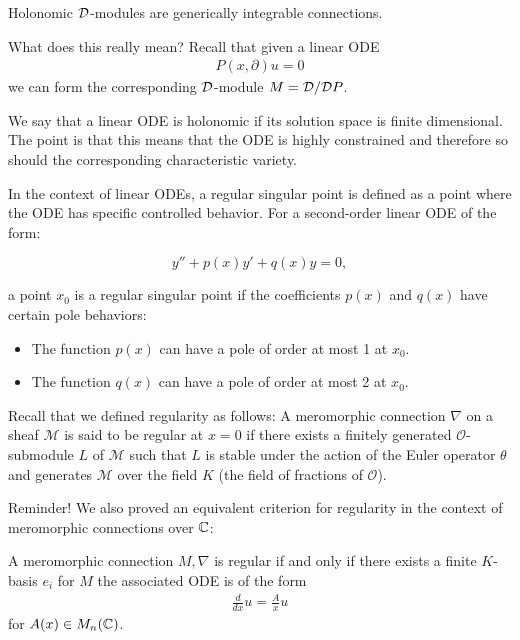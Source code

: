 \begin{theorem}
	Holonomic ${\mathcal{D}}$-modules are generically integrable connections.
\end{theorem}
What does this really mean? Recall that given a linear ODE \begin{align*}
	P(x,\partial) u = 0
\end{align*} we can form the corresponding ${\mathcal{D}}$-module $M = {\mathcal{D}}/{\mathcal{D}} P$.

\hfill

We say that a linear ODE is holonomic if
its solution space is finite dimensional.
The point is that this means that the ODE is highly constrained and
therefore so should the corresponding characteristic variety.

\hfill

In the context of linear ODEs, a regular singular point is defined as a point where the ODE has specific controlled behavior. For a second-order linear ODE of the form:

\[
	y'' + p(x)y' + q(x)y = 0,
\]

a point \( x_0 \) is a regular singular point if the coefficients \( p(x) \) and \( q(x) \) have certain pole behaviors:

\begin{itemize}
	\item The function \( p(x) \) can have a pole of order at most 1 at \( x_0 \).
	\item The function \( q(x) \) can have a pole of order at most 2 at \( x_0 \).
\end{itemize}

Recall that we defined regularity as follows:
A meromorphic connection \( \nabla \) on a sheaf \( \mathcal{M} \) is
said to be regular at \( x = 0 \) if there exists a
finitely generated \( \mathcal{O} \)-submodule \( L \) of \( \mathcal{M} \) such that
$L$ is stable under the action of the Euler operator $\theta$ and 
generates \( \mathcal{M} \) over the field \( K \) (the field of fractions of \( \mathcal{O} \)).

\hfill

Reminder! We also proved an equivalent criterion for regularity
in the context of meromorphic connections over $\mathbb{C}$:

\begin{theorem}
	A meromorphic connection $M,\nabla$ is regular
	if and only if there exists a finite $K$-basis $e_i$ for $M$ the associated
	ODE is of the form \begin{align*}
		\frac{d}{dx}u = \frac{A}{x}u
	\end{align*} for $A(x)\in M_n(\mathbb{C})$.
\end{theorem}

